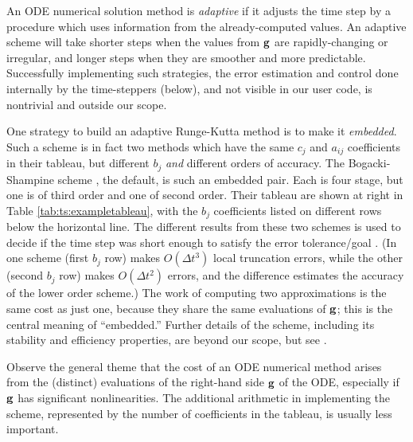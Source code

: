 An ODE numerical solution method is \emph{adaptive} if it adjusts the time step by a procedure which uses information from the already-computed values.  An adaptive scheme will take shorter steps when the values from $\mathbf{g}$ are rapidly-changing or irregular, and longer steps when they are smoother and more predictable.  Successfully implementing such strategies, the error estimation and control \citep{AscherPetzold1998} done internally by the \PETSc time-steppers (below), and not visible in our user code, is nontrivial and outside our scope.

One strategy to build an adaptive Runge-Kutta method is to make it \emph{embedded}.  Such a scheme is in fact two methods which have the same $c_j$ and $a_{ij}$ coefficients in their tableau, but different $b_j$ \emph{and} different orders of accuracy.  The Bogacki-Shampine scheme \RKthreebs, the \PETSc default, is such an embedded pair.  Each is four stage, but one is of third order and one of second order.  Their tableau are shown at right in Table \ref{tab:ts:exampletableau}, with the $b_j$ coefficients listed on different rows below the horizontal line.  The different results from these two schemes is used to decide if the time step was short enough to satisfy the error tolerance/goal \citep{Butcher1987}.  (In \RKthreebs one scheme (first $b_j$ row) makes $O(\Delta t^3)$ local truncation errors, while the other (second $b_j$ row) makes $O(\Delta t^2)$ errors, and the difference estimates the accuracy of the lower order scheme.)  The work of computing two approximations is the same cost as just one, because they share the same evaluations of $\mathbf{g}$; this is the central meaning of ``embedded.''  Further details of the \RKthreebs scheme, including its stability and efficiency properties, are beyond our scope, but see \citep{BogackiShampine1989}.

Observe the general theme that the cost of an ODE numerical method arises from the (distinct) evaluations of the right-hand side $\mathbf{g}$ of the ODE, especially if $\mathbf{g}$ has significant nonlinearities.  The additional arithmetic in implementing the scheme, represented by the number of coefficients in the tableau, is usually less important.

